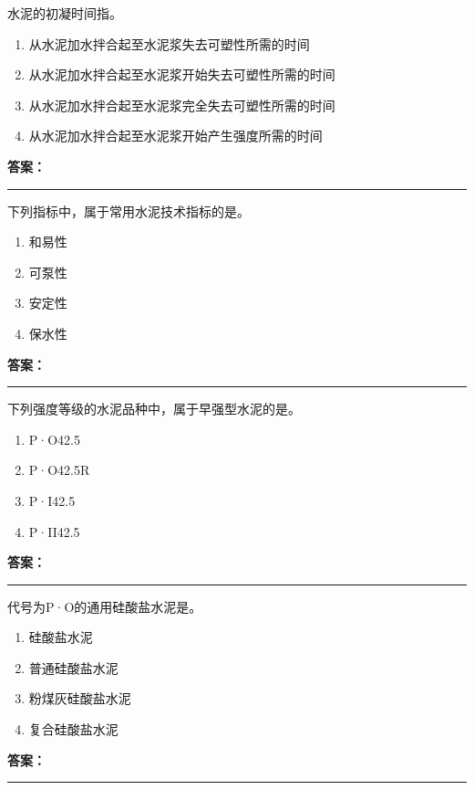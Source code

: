 \documentclass[UTF8,fontset=fandol,11pt]{ctexart}
\newcommand{\answerline}{\textcolor{answerred}{\rule{2.4cm}{0.7pt}}}
\begin{document}
\begin{quizbox}[title={第 33 题}]
水泥的初凝时间指。\\
\begin{enumerate}[label=\Alph*.]
\item 从水泥加水拌合起至水泥浆失去可塑性所需的时间
\item 从水泥加水拌合起至水泥浆开始失去可塑性所需的时间
\item 从水泥加水拌合起至水泥浆完全失去可塑性所需的时间
\item 从水泥加水拌合起至水泥浆开始产生强度所需的时间
\end{enumerate}
\textbf{\textcolor{answerred}{答案：}} \answerline
\end{quizbox}

\begin{quizbox}[title={第 34 题}]
下列指标中，属于常用水泥技术指标的是。\\
\begin{enumerate}[label=\Alph*.]
\item 和易性
\item 可泵性
\item 安定性
\item 保水性
\end{enumerate}
\textbf{\textcolor{answerred}{答案：}} \answerline
\end{quizbox}

\begin{quizbox}[title={第 35 题}]
下列强度等级的水泥品种中，属于早强型水泥的是。\\
\begin{enumerate}[label=\Alph*.]
\item P·O42.5
\item P·O42.5R
\item P·I42.5
\item P·II42.5
\end{enumerate}
\textbf{\textcolor{answerred}{答案：}} \answerline
\end{quizbox}

\begin{quizbox}[title={第 36 题}]
代号为P·O的通用硅酸盐水泥是。\\
\begin{enumerate}[label=\Alph*.]
\item 硅酸盐水泥
\item 普通硅酸盐水泥
\item 粉煤灰硅酸盐水泥
\item 复合硅酸盐水泥
\end{enumerate}
\textbf{\textcolor{answerred}{答案：}} \answerline
\end{quizbox}
\end{document}
